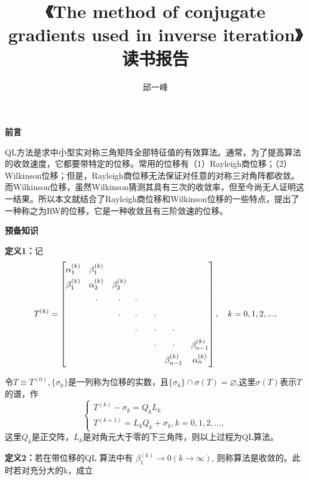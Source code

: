 \documentclass[12pt]{ctexart}
\date{}
\title{《The method of conjugate gradients used in inverse iteration》读书报告}
\author{邱一峰}
\begin{document}
\maketitle
\begin{center}
\textbf{前言}
\end{center}

QL方法是求中小型实对称三角矩阵全部特征值的有效算法。通常，为了提高算法的收敛速度，它都要带特定的位移。常用的位移有（1）Rayleigh商位移；（2）Wilkinson位移；但是，Rayleigh商位移无法保证对任意的对称三对角阵都收敛。而Wilkinson位移，虽然Wilkinson猜测其具有三次的收敛率，但至今尚无人证明这一结果。所以本文就结合了Rayleigh商位移和Wilkinson位移的一些特点，提出了一种称之为RW的位移，它是一种收敛且有三阶敛速的位移。
\begin{center}
\textbf{预备知识}
\end{center}
\textbf{定义1：}记\[
T^{(k)} =
\renewcommand\arraystretch{1.5}
\begin{bmatrix}
\alpha_1^{(k)} & \beta_1^{(k)} & & & & & \\
\beta_1^{(k)}  & \alpha_2^{(k)} & \beta_2^{(k)} & & & & \\
              & \mathord{\cdot} & \mathord{\cdot} & \mathord{\cdot} & && & \\
              &                 & \mathord{\cdot} & \mathord{\cdot} & &\mathord{\cdot} & & \\
              &                 &                 & \mathord{\cdot} & &\mathord{\cdot} & \mathord{\cdot} & \\
              &                 &                 &                 & &\mathord{\cdot} & \mathord{\cdot} &
              \beta_{n-1}^{(k)} \\
              &                 &                 &                 & &               & \beta_{n-1}^{(k)} & \alpha_n^{(k)}
\end{bmatrix}, \hspace{1em} k = 0,1,2,...,
\]

令$T\equiv T^{(0)},\{\sigma_k\}$是一列称为位移的实数，且$\{\sigma_{k}\}\cap\sigma(T)=\varnothing$,这里$\sigma(T)$表示$T$ 的谱，作
\[
\begin{cases}
T^{(k)}-\sigma_k = Q_k  L_k \\
T^{(k+1)}=L_k Q_k+\sigma_k,k =0,1,2,...,
\end{cases}
\]
这里$Q_{k}$是正交阵，$L_{k}$是对角元大于零的下三角阵，则以上过程为QL算法。


\textbf{定义2：}若在带位移的QL 算法中有
$\beta_1^{(k)}\rightarrow0(k\rightarrow\infty)$,
则称算法是收敛的。此时若对充分大的k，成立
\end{document}
